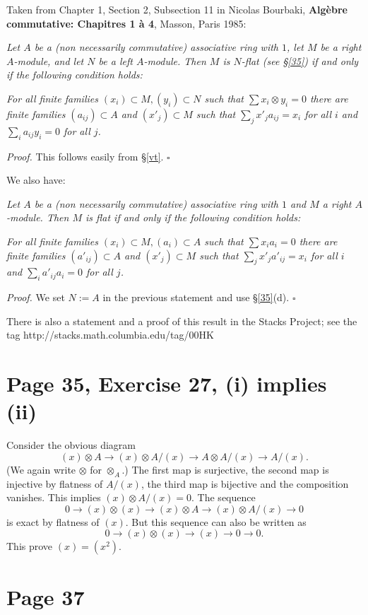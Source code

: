\documentclass[12pt]{article}
\begin{document}
Taken from Chapter 1, Section 2, Subsection 11 in Nicolas Bourbaki, \textbf{Algèbre commutative: Chapitres 1 à 4}, Masson, Paris 1985:

\emph{Let $A$ be a (non necessarily commutative) associative ring with $1$, let $M$ be a right $A$-module, and let $N$ be a left $A$-module. Then $M$ is $N$-flat (see \S\ref{35}) if and only if the following condition holds:}

\emph{For all finite families $(x_i)\subset M,(y_i)\subset N$ such that $\sum x_i\otimes y_i=0$ there are finite families $(a_{ij})\subset A$ and $(x'_j)\subset M$ such that $\sum_jx'_ja_{ij}=x_i$ for all $i$ and $\sum_ia_{ij}y_i=0$ for all $j$.}

\emph{Proof.} This follows easily from \S\ref{vt}. $\square$

We also have:

\emph{Let $A$ be a (non necessarily commutative) associative ring with $1$ and $M$ a right $A$-module. Then $M$ is flat if and only if the following condition holds:}

\emph{For all finite families $(x_i)\subset M,(a_i)\subset A$ such that $\sum x_ia_i=0$ there are finite families $(a'_{ij})\subset A$ and $(x'_j)\subset M$ such that $\sum_jx'_ja'_{ij}=x_i$ for all $i$ and $\sum_ia'_{ij}a_i=0$ for all $j$.}

\emph{Proof.} We set $N:=A$ in the previous statement and use \S\ref{35}(d). $\square$

There is also a statement and a proof of this result in the Stacks Project; see the tag http://stacks.math.columbia.edu/tag/00HK

\section{Page 35, Exercise 27, (i) implies (ii)}%

Consider the obvious diagram
$$
(x)\otimes A\to(x)\otimes A/(x)\to A\otimes A/(x)\to A/(x). 
$$ 
(We again write $\otimes$ for $\otimes_A$.) The first map is surjective, the second map is injective by flatness of $A/(x)$, the third map is bijective and the composition vanishes. This implies $(x)\otimes A/(x)=0$. The sequence 
$$
0\to(x)\otimes(x)\to(x)\otimes A\to(x)\otimes A/(x)\to0
$$ 
is exact by flatness of $(x)$. But this sequence can also be written as 
$$
0\to(x)\otimes(x)\to(x)\to0\to0.
$$ 
This prove $(x)=(x^2)$.

\section{Page 37}%
\end{document}
